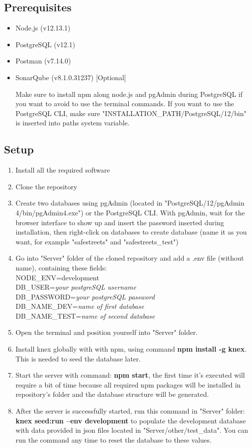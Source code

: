 \subsection{Prerequisites}
\begin{itemize}
	\item Node.js (v12.13.1)
	\item PostgreSQL (v12.1)
	\item Postman (v7.14.0)
	\item SonarQube (v8.1.0.31237)	[Optional]
	
	Make sure to install npm along node.js and pgAdmin during PostgreSQL if you want to avoid to use the terminal commands. If you want to use the PostgreSQL CLI, make sure "INSTALLATION\_PATH/PostgreSQL/12/bin" is inserted into paths system variable.
\end{itemize}

\subsection{Setup}
\begin{enumerate}
	\item Install all the required software
	\item Clone the repository
	\item Create two databases using pgAdmin (located in "PostgreSQL/12/pgAdmin 4/bin/pgAdmin4.exe") or the PostgreSQL CLI. With pgAdmin, wait for the browser interface to show up and insert the password inserted during installation, then right-click on databases to create database (name it as you want, for example "safestreets" and "safestreets\_test")
	\item Go into "Server" folder of the cloned repository and add a .env file (without name), containing these fields:\\
	NODE\_ENV=development\\
	DB\_USER=\textit{your postgreSQL username}\\
	DB\_PASSWORD=\textit{your postgreSQL password}\\
	DB\_NAME\_DEV=\textit{name of first database}\\
	DB\_NAME\_TEST=\textit{name of second database}\\
	\item Open the terminal and position yourself into "Server" folder.
	\item Install knex globally with with npm, using command \textbf{npm install -g knex}. This is needed to seed the database later.
	\item Start the server with command: \textbf{npm start}, the first time it's executed will require a bit of time because all required npm packages will be installed in repository's folder and the database structure will be generated.
	\item After the server is successfully started, run this command in "Server" folder: \textbf{knex seed:run --env development} to populate the development database with data provided in json files located in "Server/other/test\_data". You can run the command any time to reset the database to these values.
\end{enumerate}

